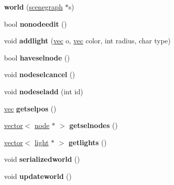 \begin{DoxyCompactItemize}
\item 
\mbox{\label{structworld_a0067ea2385cc8b7fa424760850a99baf}} 
{\bfseries world} (\hyperlink{structscenegraph}{scenegraph} $\ast$s)
\item 
\mbox{\label{structworld_af48f0014e3c178b06d150b451a7fb831}} 
bool {\bfseries nonodeedit} ()
\item 
\mbox{\label{structworld_a15220743525066b1a8de6f60ef3e111b}} 
void {\bfseries addlight} (\hyperlink{structvec}{vec} o, \hyperlink{structvec}{vec} color, int radius, char type)
\item 
\mbox{\label{structworld_ad9b1207042f207e5020ca1a25aac9327}} 
bool {\bfseries haveselnode} ()
\item 
\mbox{\label{structworld_a9d8285d626805ee049a53bbc3b99f21f}} 
void {\bfseries nodeselcancel} ()
\item 
\mbox{\label{structworld_afa533c4dcd0bcc983a382379c1962fa8}} 
void {\bfseries nodeseladd} (int id)
\item 
\mbox{\label{structworld_a31414fc6208dc12b3b60360a60c9a809}} 
\hyperlink{structvec}{vec} {\bfseries getselpos} ()
\item 
\mbox{\label{structworld_a9fa53341f3bb74a227c21e7c2c36f9fa}} 
\hyperlink{structvector}{vector}$<$ \hyperlink{structnode}{node} $\ast$ $>$ {\bfseries getselnodes} ()
\item 
\mbox{\label{structworld_ae4c07cabcad368377cb389963ec786ff}} 
\hyperlink{structvector}{vector}$<$ \hyperlink{structlight}{light} $\ast$ $>$ {\bfseries getlights} ()
\item 
\mbox{\label{structworld_a179ecc106525b94c8008fda9168dfbf7}} 
void {\bfseries serializedworld} ()
\item 
\mbox{\label{structworld_a8e392ff705f48a3d062afe3a8dff2a6a}} 
void {\bfseries updateworld} ()
\item 

\end{DoxyCompactItemize}
